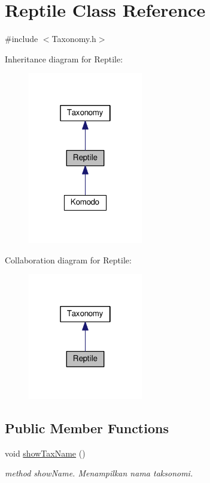 \hypertarget{classReptile}{}\section{Reptile Class Reference}
\label{classReptile}


{\ttfamily \#include $<$Taxonomy.\+h$>$}



Inheritance diagram for Reptile\+:
\nopagebreak
\begin{figure}[H]
\begin{center}
\leavevmode
\includegraphics[width=142pt]{classReptile__inherit__graph}
\end{center}
\end{figure}


Collaboration diagram for Reptile\+:
\nopagebreak
\begin{figure}[H]
\begin{center}
\leavevmode
\includegraphics[width=142pt]{classReptile__coll__graph}
\end{center}
\end{figure}
\subsection*{Public Member Functions}
\begin{DoxyCompactItemize}
\item 
void \hyperlink{classReptile_a21e391670ad15c72918f7a948db898bd}{show\+Tax\+Name} ()\hypertarget{classReptile_a21e391670ad15c72918f7a948db898bd}{}\label{classReptile_a21e391670ad15c72918f7a948db898bd}

\begin{DoxyCompactList}\small\item\em method show\+Name. Menampilkan nama taksonomi. \end{DoxyCompactList}\end{DoxyCompactItemize}


